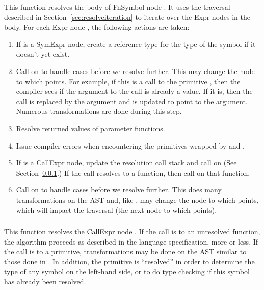 \documentclass[10pt]{article}
\begin{document}
This function resolves the body of FnSymbol node .  It uses the
traversal described in Section~\ref{sec:resolveiteration} to iterate
over the Expr nodes in the body.  For each Expr node , the
following actions are taken:
\begin{enumerate}
\item If  is a SymExpr node, create a reference type for the
  type of the symbol if it doesn't yet exist.
\item Call  on  to handle cases before we resolve
  further.  This may change the node to which  points.  For
  example, if this is a call to the primitive , then the
  compiler sees if the argument to the call is already a value.  If it
  is, then the call is replaced by the argument and  is
  updated to point to the argument.  Numerous transformations are done
  during this step.
\item Resolve returned values of parameter functions.
\item Issue compiler errors when encountering the primitives wrapped
  by  and .
\item If  is a CallExpr node, update the resolution call
  stack and call  on  (See
  Section~\ref{sec:resolveCall}.)  If the call resolves to a function,
  then call  on that function.
\item Call  on  to handle cases before we
  resolve further.  This does many transformations on the AST and,
  like , may change the node to which  points,
  which will impact the traversal (the next node to which 
  points).
\end{enumerate}

\subsubsection{}
\label{sec:resolveCall}

This function resolves the CallExpr node .  If the call is to
an unresolved function, the algorithm proceeds as described in the
language specification, more or less.  If the call is to a primitive,
transformations may be done on the AST similar to those done in
.  In addition, the  primitive is ``resolved'' in
order to determine the type of any symbol on the left-hand side, or to
do type checking if this symbol has already been resolved.
\end{document}
